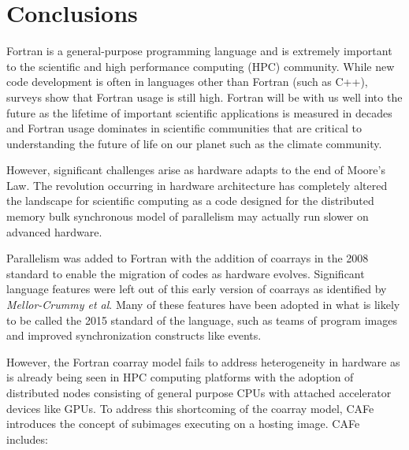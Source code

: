 \section{Conclusions}

Fortran is a general-purpose programming language and is extremely important to the
scientific and high performance computing (HPC) community.  While new code development is
often in languages other than Fortran (such as C++), surveys show that Fortran usage is
still high\cite{prabhu2011survey}.  Fortran will be with us well into the future as the
lifetime of important scientific applications is measured in decades and Fortran usage
dominates in scientific communities that are critical to understanding the future of
life on our planet such as the climate community.

However, significant challenges arise as hardware adapts to the end of Moore's
Law\cite{ashby2010opportunities}.  The revolution occurring in hardware architecture
has completely altered the landscape for scientific computing as a code designed for the
distributed memory bulk synchronous model of parallelism may actually run slower on
advanced hardware\cite{Dubey:2014:SSC:2686745.2686756}.

Parallelism was added to Fortran with the addition of coarrays in the 2008
standard\cite{Reid:2008:NFF:1408643.1408645} to enable the migration of codes as hardware evolves.
Significant language features were left out of this early version of coarrays as
identified by \emph{Mellor-Crummy et al}\cite{mellor-crummey:2009:caf2}.  Many of these features
have been adopted in what is likely to be called the 2015 standard of the language\cite{fortran:2015},
such as teams of program images and improved synchronization constructs like events.


However, the Fortran coarray model fails to address heterogeneity in hardware as is already
being seen in HPC computing platforms with the adoption of distributed nodes consisting of
general purpose CPUs with attached accelerator devices like GPUs.  To address this shortcoming
of the coarray model, CAFe introduces the concept of subimages executing on a hosting image.  
CAFe includes:

